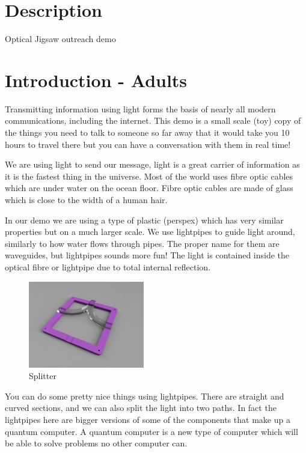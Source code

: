 \documentclass[12pt]{article}
\begin{document}
\section{Description}

Optical Jigsaw outreach demo


\section{Introduction - Adults}

Transmitting information using light forms the basis of nearly all modern communications, including the internet. This demo is a small scale (toy) copy of the things you need to talk to someone so far away that it would take you 10 hours to travel there but you can have a conversation with them in real time! 

We are using light to send our message, light is a great carrier of information as it is the fastest thing in the universe. Most of the world uses fibre optic cables which are under water on the ocean floor. Fibre optic cables are made of glass which is close to the width of a human hair.

In our demo we are using a type of plastic (perspex) which has very similar properties but on a much larger scale. We use lightpipes to guide light around, similarly to how water flows through pipes. The proper name for them are waveguides, but lightpipes sounds more fun! The light is contained inside the optical fibre or lightpipe due to total internal reflection.

\begin{figure}[h]
\centering
\includegraphics[width=0.45\textwidth]{figures/jigsaw_y-junction.jpg}
\caption{Splitter}
\end{figure}

You can do some pretty nice things using lightpipes. There are straight and curved sections, and we can also split the light into two paths. In fact the lightpipes here are bigger versions of some of the components that make up a quantum computer. A quantum computer is a new type of computer which will be able to solve problems no other computer can.
\end{document}
